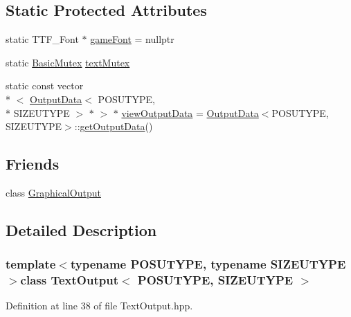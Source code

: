 \subsection*{Static Protected Attributes}
\begin{DoxyCompactItemize}
\item 
static T\-T\-F\-\_\-\-Font $\ast$ \hyperlink{class_text_output_a784e5c34428d43ed01fc5367638df07e}{game\-Font} = nullptr
\item 
static \hyperlink{class_basic_mutex}{Basic\-Mutex} \hyperlink{class_text_output_a64b0160aa7e8ebe7b65744197886662e}{text\-Mutex}
\item 
static const vector\\*
$<$ \hyperlink{struct_output_data}{Output\-Data}$<$ P\-O\-S\-U\-T\-Y\-P\-E, \\*
S\-I\-Z\-E\-U\-T\-Y\-P\-E $>$ $\ast$ $>$ $\ast$ \hyperlink{class_text_output_ae8c77617052494529e2e15a1379c8fa2}{view\-Output\-Data} = \hyperlink{struct_output_data}{Output\-Data}$<$P\-O\-S\-U\-T\-Y\-P\-E, S\-I\-Z\-E\-U\-T\-Y\-P\-E$>$\-::\hyperlink{class_text_output_ae0f04c5f70ce6e372f7859daedbf39ee}{get\-Output\-Data}()
\end{DoxyCompactItemize}
\subsection*{Friends}
\begin{DoxyCompactItemize}
\item 
class \hyperlink{class_text_output_a0969009180cf671defc02a7b2ad9d500}{Graphical\-Output}
\end{DoxyCompactItemize}


\subsection{Detailed Description}
\subsubsection*{template$<$typename P\-O\-S\-U\-T\-Y\-P\-E, typename S\-I\-Z\-E\-U\-T\-Y\-P\-E$>$class Text\-Output$<$ P\-O\-S\-U\-T\-Y\-P\-E, S\-I\-Z\-E\-U\-T\-Y\-P\-E $>$}



Definition at line 38 of file Text\-Output.\-hpp.



